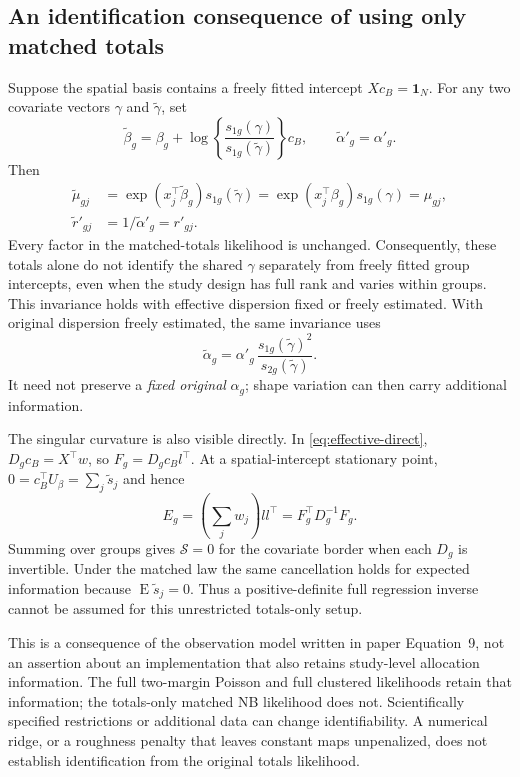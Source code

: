\documentclass[11pt,a4paper]{article}
\newcommand{\E}{\operatorname{E}}
\numberwithin{equation}{section}
\begin{document}
\subsection{An identification consequence of using only matched totals}
\label{sec:aggregate-identification}
Suppose the spatial basis contains a freely fitted intercept
$Xc_B=\mathbf1_N$. For any two covariate vectors $\gamma$ and
$\widetilde\gamma$, set
\[
 \widetilde\beta_g=\beta_g+
   \log\!\left\{\frac{s_{1g}(\gamma)}
                      {s_{1g}(\widetilde\gamma)}\right\}c_B,
 \qquad \widetilde\alpha'_g=\alpha'_g.
\]
Then
\begin{align}
 \widetilde\mu_{gj}
 &=\exp(x_j^\top\widetilde\beta_g)s_{1g}(\widetilde\gamma)
   =\exp(x_j^\top\beta_g)s_{1g}(\gamma)=\mu_{gj},\\
 \widetilde r'_{gj}&=1/\widetilde\alpha'_g=r'_{gj}.
\end{align}
Every factor in the matched-totals likelihood is unchanged.
Consequently, these totals alone do not identify the shared
$\gamma$ separately from freely fitted group intercepts, even
when the study design has full rank and varies within groups.
This invariance holds with effective dispersion fixed or freely
estimated. With original dispersion freely estimated, the same
invariance uses
\[
 \widetilde\alpha_g
  =\alpha'_g\,\frac{s_{1g}(\widetilde\gamma)^2}
                       {s_{2g}(\widetilde\gamma)}.
\]
It need not preserve a \emph{fixed original} $\alpha_g$; shape
variation can then carry additional information.

The singular curvature is also visible directly.
In \eqref{eq:effective-direct}, $D_gc_B=X^\top w$, so
$F_g=D_gc_Bl^\top$. At a spatial-intercept stationary point,
$0=c_B^\top U_\beta=\sum_j\widetilde s_j$ and hence
\[
 E_g=\left(\sum_jw_j\right)ll^\top
     =F_g^\top D_g^{-1}F_g.
\]
Summing over groups gives $\mathcal S=0$ for the covariate border
when each $D_g$ is invertible. Under the matched law the same
cancellation holds for expected information because $\E\widetilde s_j=0$.
Thus a positive-definite full regression inverse cannot be assumed
for this unrestricted totals-only setup.

This is a consequence of the observation model written in
paper Equation~9, not an assertion about an implementation that
also retains study-level allocation information.
The full two-margin Poisson and full clustered likelihoods retain
that information; the totals-only matched NB likelihood does not.
Scientifically specified restrictions or additional data can change
identifiability. A numerical ridge, or a roughness penalty that
leaves constant maps unpenalized, does not establish identification
from the original totals likelihood.
\end{document}
